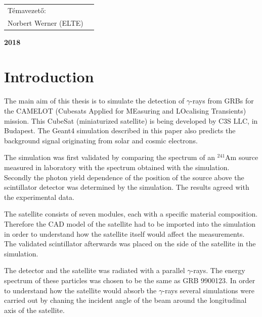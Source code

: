 \documentclass[12pt, a4paper,titlepage]{article}
\numberwithin{equation}{section}
\numberwithin{figure}{section}
\begin{document}
\begin{titlepage}
\begin{center}
\vspace{4 cm}
\end{center}

\begin{center}
\begin{tabular}{ll}
\centerline{ Témavezető: } \\
\centerline{ Norbert Werner (ELTE)}
\end{tabular}
\end{center}
\begin{center}

\vspace{1.5 cm}
\large \textbf {2018}\\
\end{center}
\end{titlepage}
\tableofcontents
{}



\pagebreak
{}
\setcounter{page}{1}




\section{Introduction}

The main aim of this thesis is to simulate the detection of $\gamma$-rays from GRBs for the CAMELOT (Cubesats Applied for MEasuring and LOcalising Transients) mission. This CubeSat (miniaturized satellite) is being developed by C3S LLC, in Budapest. The Geant4 simulation described in this paper also predicts the background signal originating from solar and cosmic electrons. 

The simulation was first validated by comparing the spectrum of an $^{241}$Am source measured in laboratory with the spectrum obtained with the simulation. Secondly the photon yield dependence of the position of the source above the scintillator detector was determined by the simulation. The results agreed with the experimental data.

The satellite consists of seven modules, each with a specific material composition. Therefore the CAD model of the satellite had to be imported into the simulation in order to understand how the satellite itself would affect the measurements. The validated scintillator afterwards was placed on the side of the satellite in the simulation.

The detector and the satellite was radiated with a parallel $\gamma$-rays. The energy spectrum of these particles was chosen to be the same as GRB 9900123. In order to understand  how the satellite would absorb the $\gamma$-rays several simulations were carried out by chaning the incident angle of the beam around the longitudinal axis of the satellite.
\end{document}
